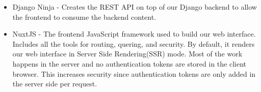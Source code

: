 \begin{itemize}
	\item	Django Ninja - Creates the REST API on top of our Django backend to allow the frontend to consume the backend content.
\end{itemize}

\begin{itemize}
	\item	NuxtJS - The frontend JavaScript framework used to build our web interface. Includes all the tools for routing, quering, and security. By default, it renders our web interface in Server Side Rendering(SSR) mode. Most of the work happens in the server and no authentication tokens are stored in the client browser. This increases security since authentication tokens are only added in the server side per request.
\end{itemize}
	
